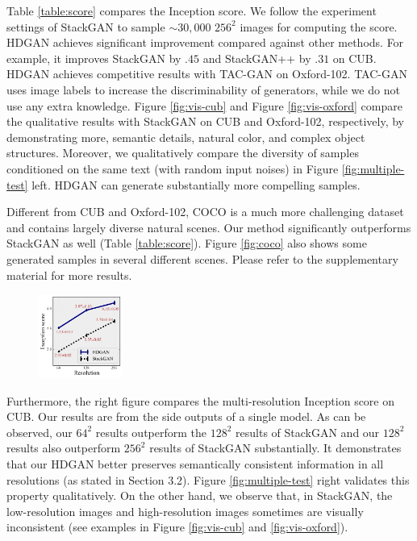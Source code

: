 \documentclass[10pt,twocolumn,letterpaper]{article}
\begin{document}
Table \ref{table:score} compares the Inception score. We follow the experiment settings of StackGAN to sample ${\sim}30,000$ $256^2$ images for computing the score.
HDGAN achieves significant improvement compared against other methods. For example, it improves StackGAN by $.45$ and StackGAN++ by $.31$ on CUB.
HDGAN achieves competitive results with TAC-GAN on Oxford-102. TAC-GAN uses image labels to increase the discriminability of generators, while we do not use any extra knowledge. 
Figure \ref{fig:vis-cub} and Figure \ref{fig:vis-oxford} compare the qualitative results with StackGAN on CUB and Oxford-102, respectively, by demonstrating more, semantic details, natural color, and complex object structures. 
Moreover, we qualitatively compare the diversity of samples conditioned on the same text (with random input noises) in Figure \ref{fig:multiple-test} left. HDGAN can generate substantially more compelling samples. 


Different from CUB and Oxford-102, COCO is a much more challenging dataset and contains largely diverse natural scenes. 
Our method significantly outperforms StackGAN as well (Table \ref{table:score}). 
Figure \ref{fig:coco} also shows some generated samples in several different scenes. Please refer to the supplementary material for more results. 


\begingroup
\setlength{\intextsep}{-4pt}%
\setlength{\columnsep}{0pt}%
\begin{figure}
	\centering
	\includegraphics[width=0.245\textwidth]{figure/multiscale_inception_2.pdf}
	\vspace{-12pt}
\end{figure}
Furthermore, the right figure compares the multi-resolution Inception score on CUB. Our results are from the side outputs of a single model. As can be observed, our $64^2$ results outperform the $128^2$ results of StackGAN and our $128^2$ results also outperform $256^2$ results of StackGAN substantially. It demonstrates that our HDGAN better preserves semantically consistent information in all resolutions (as stated in Section 3.2). Figure \ref{fig:multiple-test} right validates this property qualitatively. On the other hand, we observe that, in StackGAN, the low-resolution images and high-resolution images sometimes are visually inconsistent (see examples in Figure \ref{fig:vis-cub} and \ref{fig:vis-oxford}).
\end{document}

